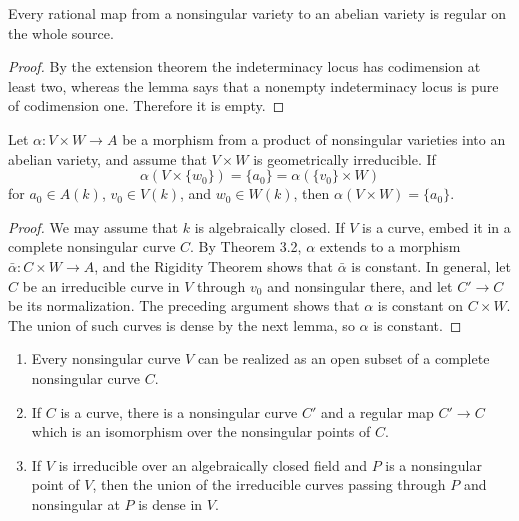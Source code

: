 \begin{theorem}
\label{thm:milne-rational-to-abelian-regular}

Every rational map from a nonsingular variety to an abelian variety is regular
on the whole source.
\end{theorem}

\begin{proof}
By the extension theorem the indeterminacy locus has codimension at least two,
whereas the lemma says that a nonempty indeterminacy locus is pure of
codimension one.  Therefore it is empty.
\end{proof}

\begin{theorem}
\label{thm:milne-rational-product-rigidity}

Let $\alpha:V\times W\to A$ be a morphism from a product of nonsingular
varieties into an abelian variety, and assume that $V\times W$ is geometrically
irreducible.  If
\[
 \alpha(V\times\{w_0\})=\{a_0\}=\alpha(\{v_0\}\times W)
\]
for $a_0\in A(k)$, $v_0\in V(k)$, and $w_0\in W(k)$, then
$\alpha(V\times W)=\{a_0\}$.
\end{theorem}

\begin{proof}
We may assume that $k$ is algebraically closed.  If $V$ is a curve, embed it
in a complete nonsingular curve $C$.  By Theorem 3.2, $\alpha$ extends to a
morphism $\bar\alpha:C\times W\to A$, and the Rigidity Theorem shows that
$\bar\alpha$ is constant.  In general, let $C$ be an irreducible curve in $V$
through $v_0$ and nonsingular there, and let $C'\to C$ be its normalization.
The preceding argument shows that $\alpha$ is constant on $C\times W$.  The
union of such curves is dense by the next lemma, so $\alpha$ is constant.
\end{proof}

\begin{lemma}
\label{lem:milne-curves-through-smooth-point}

\begin{enumerate}
\item Every nonsingular curve $V$ can be realized as an open subset of a
complete nonsingular curve $C$.
\item If $C$ is a curve, there is a nonsingular curve $C'$ and a regular map
$C'\to C$ which is an isomorphism over the nonsingular points of $C$.
\item If $V$ is irreducible over an algebraically closed field and $P$ is a
nonsingular point of $V$, then the union of the irreducible curves passing
through $P$ and nonsingular at $P$ is dense in $V$.
\end{enumerate}
\end{lemma}

